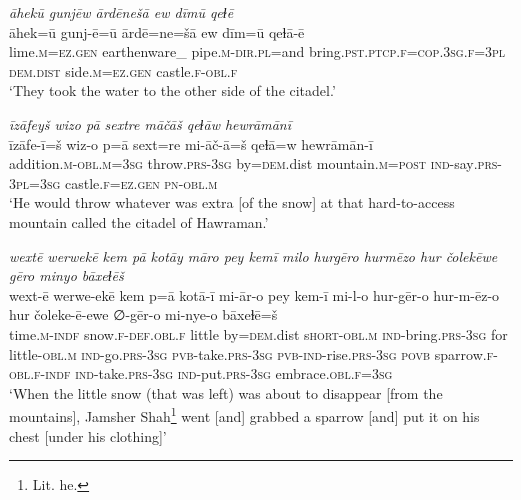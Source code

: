 \ea \label{DP.32}
\textit{āhekū gunjēw ārdēnešā ew dīmū qeɫē} \\ 
\gll āhek=ū gunj-ē=ū ārdē=ne=šā ew dīm=ū qeɫā-ē \\ 
 lime\textsc{.m}\textsc{=ez}\textsc{.gen} earthenware\_ pipe\textsc{.m}\textsc{-dir}\textsc{.pl}=and bring\textsc{.pst}\textsc{.ptcp}\textsc{\textsc{.f}}\textsc{=cop}\textsc{.3sg}\textsc{\textsc{.f}}\textsc{=3pl} \textsc{dem.dist} side\textsc{.m}\textsc{=ez}\textsc{.gen} castle\textsc{\textsc{.f}}\textsc{-obl}\textsc{\textsc{.f}} \\ 
\glt `They took the water to the other side of the citadel.'
\z 
 
\ea \label{DP.35}
\textit{īzāfeyš wizo pā sextre māčāš qeɫāw hewrāmānī} \\ 
\gll īzāfe-ī=š wiz-o p=ā sext=re mi-āč-ā=š qeɫā=w hewrāmān-ī \\ 
 addition\textsc{.m}\textsc{-obl}\textsc{.m}\textsc{=3sg} throw\textsc{.prs}\textsc{-3sg} by\textsc{=dem}.dist mountain\textsc{.m}\textsc{=\textsc{post}} \textsc{ind-}say\textsc{.prs}\textsc{-3pl}\textsc{=3sg} castle\textsc{\textsc{.f}}\textsc{=ez}\textsc{.gen} \textsc{pn}\textsc{-obl}\textsc{.m} \\ 
\glt `He would throw whatever was extra [of the snow] at that hard-to-access mountain called the citadel of Hawraman.'
\z 
 
\ea \label{DP.36}
\textit{wextē werwekē kem pā kotāy māro pey kemī milo hurgēro hurmēzo hur čolekēwe gēro minyo bāxeɫēš} \\ 
\gll wext-ē werwe-ekē kem p=ā kotā-ī mi-ār-o pey kem-ī mi-l-o hur-gēr-o hur-m-ēz-o hur čoleke-ē-ewe ∅-gēr-o mi-nye-o bāxeɫē=š \\ 
 time\textsc{.m}\textsc{-indf} snow\textsc{\textsc{.f}}\textsc{-def}\textsc{.obl}\textsc{\textsc{.f}} little by\textsc{=dem}.dist s\textsc{hort}\textsc{-obl}\textsc{.m} \textsc{ind-}bring\textsc{.prs}\textsc{-3sg} for little\textsc{-obl}\textsc{.m} \textsc{ind-}go\textsc{.prs}\textsc{-3sg} \textsc{pvb-}take\textsc{.prs}\textsc{-3sg} \textsc{pvb-}\textsc{ind-}rise\textsc{.prs}\textsc{-3sg} \textsc{povb} sparrow\textsc{\textsc{.f}}\textsc{-obl}\textsc{\textsc{.f}}\textsc{-indf} \textsc{ind-}take\textsc{.prs}\textsc{-3sg} \textsc{ind-}put\textsc{.prs}\textsc{-3sg} embrace\textsc{.obl}\textsc{\textsc{.f}}\textsc{=3sg} \\ 
\glt `When the little snow (that was left) was about to disappear [from the mountains], Jamsher Shah\footnote{Lit. he.} went [and] grabbed a sparrow [and] put it on his chest [under his clothing]'
\z 
 
